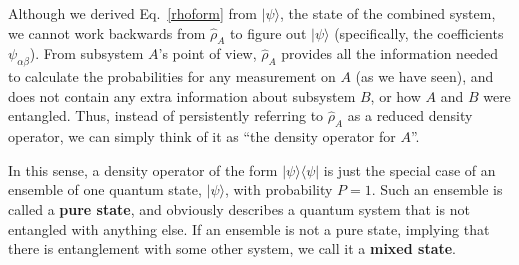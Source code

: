 \documentclass[pra,12pt]{revtex4-2}
\begin{document}
Although we derived Eq.~\eqref{rhoform} from $|\psi\rangle$, the state
of the combined system, we cannot work backwards from $\hat{\rho}_A$
to figure out $|\psi\rangle$ (specifically, the coefficients
$\psi_{\alpha\beta}$).  From subsystem $A$'s point of view,
$\hat{\rho}_A$ provides all the information needed to calculate the
probabilities for any measurement on $A$ (as we have seen), and does
not contain any extra information about subsystem $B$, or how $A$ and
$B$ were entangled.  Thus, instead of persistently referring to
$\hat{\rho}_A$ as a reduced density operator, we can simply think of
it as ``the density operator for $A$''.

In this sense, a density operator of the form
$|\psi\rangle\langle\psi|$ is just the special case of an ensemble of
one quantum state, $|\psi\rangle$, with probability $P = 1$.  Such an
ensemble is called a \textbf{pure state}, and obviously describes a
quantum system that is not entangled with anything else.  If an
ensemble is not a pure state, implying that there is entanglement with
some other system, we call it a \textbf{mixed state}.
\end{document}
